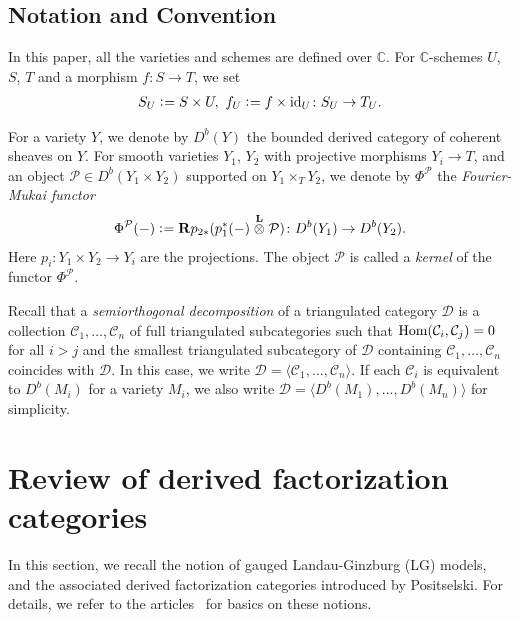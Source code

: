 \documentclass[11pt]{amsart}
\theoremstyle{plain}
\newcommand{\cC}{\mathcal{C}}
\newcommand{\dD}{\mathcal{D}}
\newcommand{\pP}{\mathcal{P}}
\newcommand{\Hom}{\mathop{\rm Hom}\nolimits}
\newcommand{\dotimes}{\stackrel{\textbf{L}}{\otimes}}
\newcommand{\dR}{\mathbf{R}}
\newcommand{\id}{\textrm{id}}
\begin{document}
\subsection{Notation and Convention}
In this paper, all the varieties and schemes
are defined over $\mathbb{C}$. 
For $\mathbb{C}$-schemes $U$, $S$, $T$
and a morphism $f \colon S \to T$, we set 
\begin{align*}
S_U \cneq S \times U, \ 
f_U \cneq f \times \id_U \colon S_U \to T_U.
\end{align*}

For a variety $Y$, we denote by $D^b(Y)$ 
the bounded derived category of coherent sheaves on $Y$. 
For smooth varieties $Y_1$, $Y_2$ with 
projective morphisms 
$Y_i \to T$, 
and an object $\pP \in D^b(Y_1 \times Y_2)$
supported on $Y_1 \times_T Y_2$, we denote by 
$\Phi^{\pP}$ the \textit{Fourier-Mukai 
functor}
\begin{align*}
\Phi^{\pP}(-) 
\cneq \dR p_{2\ast}(p_1^{\ast}(-) \dotimes \pP) \colon 
D^b(Y_1) \to D^b(Y_2).
\end{align*}
Here $p_i \colon Y_1 \times Y_2 \to Y_i$ are the projections. 
The object $\pP$ is called a \textit{kernel} of the 
functor $\Phi^{\pP}$. 

Recall that a \textit{semiorthogonal decomposition} of a
triangulated category $\dD$ is a collection 
$\cC_1, \ldots, \cC_n$ of full 
triangulated subcategories such that 
$\Hom(\cC_i, \cC_j)=0$ for all $i>j$
and the smallest triangulated 
subcategory of $\dD$ containing 
$\cC_1, \ldots, \cC_n$
coincides with $\dD$. In this case, 
we write $\dD=\langle \cC_1, \ldots, \cC_n \rangle$. 
If each $\cC_i$ is equivalent to 
$D^b(M_i)$ for a variety $M_i$, 
we also write 
$\dD=\langle D^b(M_1), \ldots, D^b(M_n) \rangle$
for simplicity. 

\section{Review of derived factorization categories}\label{sec:review}
In this section, we recall the notion of 
gauged Landau-Ginzburg (LG) models, and the 
associated derived factorization categories
introduced by Positselski. 
For details, we refer to the articles~\cite{MR3366002,MR3366002}
for basics on these notions. 
\end{document}
